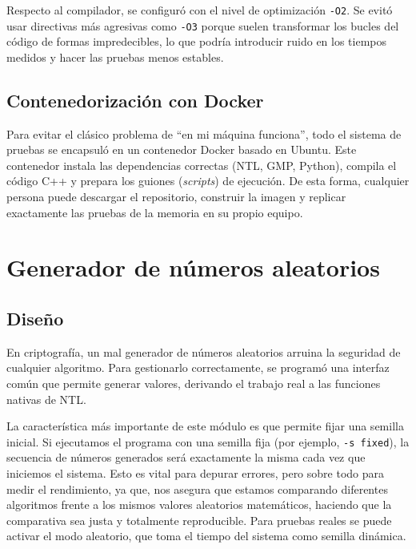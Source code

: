 Respecto al compilador, se configuró con el nivel de optimización \texttt{-O2}. Se evitó usar directivas más agresivas como \texttt{-O3} porque suelen transformar los bucles del código de formas 
impredecibles, lo que podría introducir ruido en los tiempos medidos y hacer las pruebas menos estables.

\subsection{Contenedorización con Docker}
\label{subsec:impl-docker}

Para evitar el clásico problema de ``en mi máquina funciona'', todo el sistema de pruebas se encapsuló en un contenedor Docker basado en Ubuntu. Este contenedor instala las dependencias 
correctas (NTL, GMP, Python), compila el código C++ y prepara los guiones (\textit{scripts}) de ejecución. De esta forma, cualquier persona puede descargar el repositorio, construir la 
imagen y replicar exactamente las pruebas de la memoria en su propio equipo.


\section{Generador de números aleatorios}
\label{sec:impl-rng}

\subsection{Diseño}
\label{subsec:impl-rng-diseno}

En criptografía, un mal generador de números aleatorios arruina la seguridad de cualquier algoritmo. Para gestionarlo correctamente, se programó una interfaz común que permite generar 
valores, derivando el trabajo real a las funciones nativas de NTL.

La característica más importante de este módulo es que permite fijar una semilla inicial. Si ejecutamos el programa con una semilla fija (por ejemplo, \texttt{-s fixed}), la secuencia de 
números generados será exactamente la misma cada vez que iniciemos el sistema. Esto es vital para depurar errores, pero sobre todo para medir el rendimiento, ya que, nos asegura que estamos 
comparando diferentes algoritmos frente a los mismos valores aleatorios matemáticos, haciendo que la comparativa sea justa y totalmente reproducible. Para pruebas reales se puede activar el modo 
aleatorio, que toma el tiempo del sistema como semilla dinámica.

